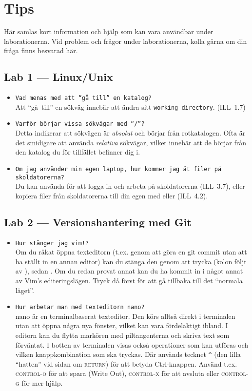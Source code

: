 \documentclass[fleqn, article, a4paper]{memoir}
\newcommand{\commandchar}[1]{\textsc{#1}}
\begin{document}
\newpage
\section{Tips}

Här samlas kort information och hjälp som kan vara användbar under laborationerna. Vid problem och frågor under laborationerna, kolla gärna om din fråga finns besvarad här.

\subsection{Lab 1 --- Linux/Unix}
\begin{itemize}
	\item \texttt{Vad menas med att ``gå till'' en katalog?}\\
	      Att ``gå~till'' en sökväg innebär att ändra sitt \texttt{working directory}. (ILL~1.7)
	\item \texttt{Varför börjar vissa sökvägar med ``/''?}\\
	      Detta indikerar att sökvägen är \emph{absolut} och börjar från rotkatalogen. Ofta är det smidigare att använda \emph{relativa} sökvägar, vilket innebär att de börjar från den katalog du för tillfället befinner dig i.
	\item \texttt{Om jag använder min egen laptop, hur kommer jag åt filer på skoldatorerna?}\\
	      Du kan använda  för att logga in och arbeta på skoldatorerna (ILL~3.7), eller kopiera filer från skoldatorerna till din egen med  eller  (ILL~4.2).
\end{itemize}

\subsection{Lab 2 --- Versionshantering med Git}
\begin{itemize}
	\item \texttt{Hur stänger jag vim!?}\\
	      Om du råkat öppna texteditorn  (t.ex. genom att göra en git commit utan att ha ställt in en annan editor) kan du stänga den genom att trycka  (kolon följt av ), sedan . Om du redan provat annat kan du ha kommit in i något annat av Vim's editeringslägen. Tryck då först  för att gå tillbaka till det ``normala läget''.
	\item \texttt{Hur arbetar man med texteditorn nano?} \\
	      nano är en terminalbaserat texteditor. Den körs alltså direkt i terminalen utan att öppna några nya fönster, vilket kan vara fördelaktigt ibland. I editorn kan du flytta markören med piltangenterna och skriva text som förväntat. I botten av terminalen visas också operationer som kan utföras och vilken knappkombination som ska tryckas. Där används tecknet \texttt{\^{}} (den lilla ``hatten'' vid sidan om \commandchar{return}) för att betyda Ctrl-knappen. Använd t.ex. \commandchar{control-o} för att spara (Write Out), \commandchar{control-x} för att avsluta eller \commandchar{control-g} för mer hjälp.
\end{itemize}
\end{document}
